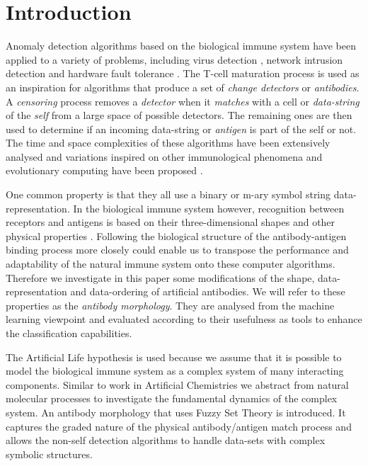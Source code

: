 \documentclass{llncs}
\begin{document}
\section{Introduction}
Anomaly detection algorithms based on the biological immune system have been applied to a variety of problems, including virus detection \cite{forrest}, network intrusion detection \cite{kim} \cite{hofmeyr} and hardware fault tolerance \cite{tyrrell}.
The T-cell maturation process is used as an inspiration for algorithms that produce a set of {\it change detectors} or {\it antibodies}.
A {\it censoring} process removes a {\it detector} when it {\it matches} with a cell or {\it data-string} of the {\it self} from a large space of possible detectors.
The remaining ones are then used to determine if an incoming data-string or {\it antigen} is part of the self or not.
The time and space complexities of these algorithms have been extensively analysed and variations inspired on other immunological phenomena \cite{oprea} and evolutionary computing \cite{perelson} \cite{hightower} have been proposed \cite{kim}.

One common property is that they all use a binary or m-ary symbol string data-representation.
In the biological immune system however, recognition between receptors and antigens is based on their three-dimensional shapes and other physical properties \cite{parham}.
Following the biological structure of the antibody-antigen binding process more closely could enable us to transpose the performance and adaptability of the natural immune system onto these computer algorithms.
Therefore we investigate in this paper some modifications of the shape, data-representation and data-ordering of artificial antibodies.
We will refer to these properties as the {\it antibody morphology}.
They are analysed from the machine learning viewpoint and evaluated according to their usefulness as tools to enhance the classification capabilities.

The Artificial Life hypothesis is used because we assume that it is possible to model the biological immune system as a complex system of many interacting components.
Similar to work in Artificial Chemistries \cite{dittrich} we abstract from natural molecular processes to investigate the fundamental dynamics of the complex system.
An antibody morphology that uses Fuzzy Set Theory \cite{zadeh} is introduced.
It captures the graded nature of the physical antibody/antigen match process and allows the non-self detection algorithms to handle data-sets with complex symbolic structures.
\end{document}
